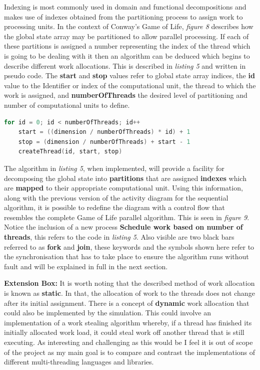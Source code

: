 \documentclass[11pt]{article} %
\begin{document}
Indexing is most commonly used in domain and functional decompositions and makes use of indexes obtained from the partitioning process to assign work to processing units. In the context of Conway's Game of Life, {\it figure 8} describes how the global state array may be partitioned to allow parallel processing. If each of these partitions is assigned a number representing the index of the thread which is going to be dealing with it then an algorithm can be deduced which begins to describe different work allocations. This is described in {\it listing 5} and written in pseudo code. The {\bf start} and {\bf stop} values refer to global state array indices, the {\bf id} value to the Identifier or index of the computational unit, the thread to which the work is assigned, and {\bf numberOfThreads} the desired level of partitioning and number of computational units to define.
\begin{lstlisting}[language=C, caption={Pseudo Domain Decomposition and Thread Mapping Algorithm}]
for id = 0; id < numberOfThreads; id++
    start = ((dimension / numberOfThreads) * id) + 1
    stop = (dimension / numberOfThreads) + start - 1
    createThread(id, start, stop)
\end{lstlisting}
The algorithm in {\it listing 5}, when implemented, will provide a facility for decomposing the global state into {\bf partitions} that are assigned {\bf indexes} which are {\bf mapped} to their appropriate computational unit. Using this information, along with the previous version of the activity diagram for the sequential algorithm, it is possible to redefine the diagram with a control flow that resembles the complete Game of Life parallel algorithm. This is seen in {\it figure 9}. Notice the inclusion of a new process {\bf Schedule work based on number of threads}, this refers to the code in {\it listing 5}. Also visible are two black bars referred to as {\bf fork} and {\bf join}, these keywords and the symbols shown here refer to the synchronisation that has to take place to ensure the algorithm runs without fault and will be explained in full in the next section.
\smallskip
\begin{mdframed}
{\bf Extension Box:} It is worth noting that the described method of work allocation is known as {\bf static}. In that, the allocation of work to the threads does not change after its initial assignment. There is a concept of {\bf dynamic} work allocation that could also be implemented by the simulation. This could involve an implementation of a work stealing algorithm whereby, if a thread has finished its initially allocated work load, it could steal work off another thread that is still executing. As interesting and challenging as this would be I feel it is out of scope of the project as my main goal is to compare and contrast the implementations of different multi-threading languages and libraries.
\end{mdframed}
\end{document}
